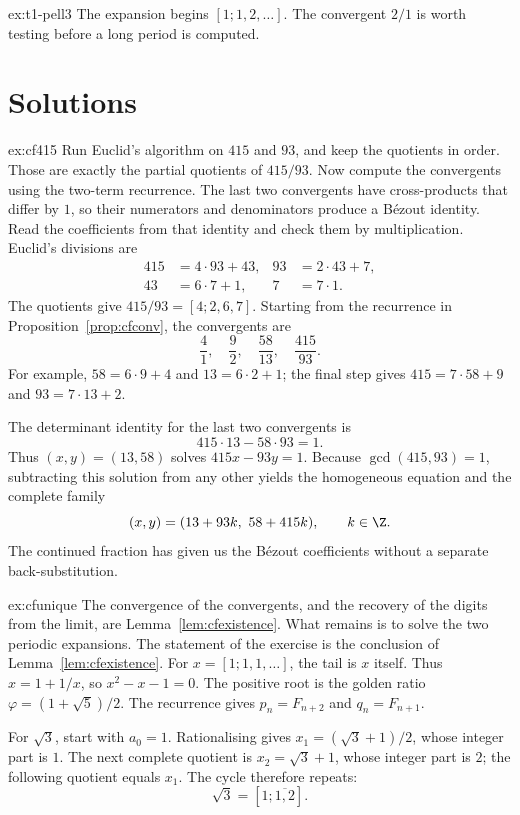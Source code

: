 \begin{hint}{ex:t1-pell3}
The expansion begins $[1;1,2,\ldots]$. The convergent $2/1$ is worth testing before a long period is computed.
\end{hint}

\section{Solutions}

\begin{solution}{ex:cf415}
\idea Run Euclid's algorithm on $415$ and $93$, and keep the quotients in order. Those are exactly the partial quotients of $415/93$. Now compute the convergents using the two-term recurrence. The last two convergents have cross-products that differ by $1$, so their numerators and denominators produce a B\'ezout identity. Read the coefficients from that identity and check them by multiplication.
\writeup Euclid's divisions are
\[
\begin{aligned}
415&=4\cdot93+43, &93&=2\cdot43+7,\\
43&=6\cdot7+1, &7&=7\cdot1.
\end{aligned}
\]
The quotients give $415/93=[4;2,6,7]$. Starting from the recurrence in Proposition~\ref{prop:cfconv}, the convergents are
\[
\frac41,\quad\frac92,\quad\frac{58}{13},\quad\frac{415}{93}.
\]
For example, $58=6\cdot9+4$ and $13=6\cdot2+1$; the final step gives $415=7\cdot58+9$ and $93=7\cdot13+2$.

The determinant identity for the last two convergents is
\[
415\cdot13-58\cdot93=1.
\]
Thus $(x,y)=(13,58)$ solves $415x-93y=1$. Because $\gcd(415,93)=1$, subtracting this solution from any other yields the homogeneous equation and the complete family
\[
(x,y)=(13+93k,\ 58+415k),\qquad k\in\Z.
\]
The continued fraction has given us the B\'ezout coefficients without a separate back-substitution.
\end{solution}

\begin{solution}{ex:cfunique}
\idea The convergence of the convergents, and the recovery of the digits from the limit, are Lemma~\ref{lem:cfexistence}. What remains is to solve the two periodic expansions.
\writeup The statement of the exercise is the conclusion of Lemma~\ref{lem:cfexistence}. For $x=[1;1,1,\ldots]$, the tail is $x$ itself. Thus $x=1+1/x$, so $x^2-x-1=0$. The positive root is the golden ratio $\varphi=(1+\sqrt5)/2$. The recurrence gives $p_n=F_{n+2}$ and $q_n=F_{n+1}$.

For $\sqrt3$, start with $a_0=1$. Rationalising gives $x_1=(\sqrt3+1)/2$, whose integer part is $1$. The next complete quotient is $x_2=\sqrt3+1$, whose integer part is $2$; the following quotient equals $x_1$. The cycle therefore repeats:
\[
\sqrt3=[1;\overline{1,2}].
\]
\end{solution}


